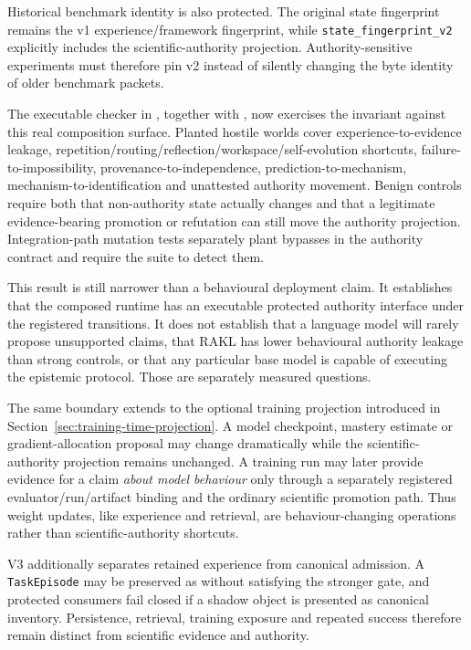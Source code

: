Historical benchmark identity is also protected.  The original state fingerprint remains the v1 experience/framework fingerprint, while \texttt{state\_fingerprint\_v2} explicitly includes the scientific-authority projection.  Authority-sensitive experiments must therefore pin v2 instead of silently changing the byte identity of older benchmark packets.

\begin{sloppypar}
The executable checker in , together with , now exercises the invariant against this real composition surface.  Planted hostile worlds cover experience-to-evidence leakage, repetition/routing/reflection/workspace/self-evolution shortcuts, failure-to-impossibility, provenance-to-independence, prediction-to-mechanism, mechanism-to-identification and unattested authority movement.  Benign controls require both that non-authority state actually changes and that a legitimate evidence-bearing promotion or refutation can still move the authority projection.  Integration-path mutation tests separately plant bypasses in the authority contract and require the suite to detect them.
\end{sloppypar}

This result is still narrower than a behavioural deployment claim.  It establishes that the composed runtime has an executable protected authority interface under the registered transitions.  It does not establish that a language model will rarely propose unsupported claims, that RAKL has lower behavioural authority leakage than strong controls, or that any particular base model is capable of executing the epistemic protocol.  Those are separately measured questions.

The same boundary extends to the optional training projection introduced in Section~\ref{sec:training-time-projection}.  A model checkpoint, mastery estimate or gradient-allocation proposal may change dramatically while the scientific-authority projection remains unchanged.  A training run may later provide evidence for a claim \emph{about model behaviour} only through a separately registered evaluator/run/artifact binding and the ordinary scientific promotion path.  Thus weight updates, like experience and retrieval, are behaviour-changing operations rather than scientific-authority shortcuts.

V3 additionally separates retained experience from canonical admission.  A \texttt{TaskEpisode} may be preserved as  without satisfying the stronger  gate, and protected consumers fail closed if a shadow object is presented as canonical inventory.  Persistence, retrieval, training exposure and repeated success therefore remain distinct from scientific evidence and authority.
